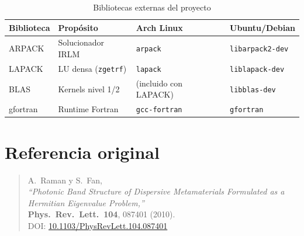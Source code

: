 \documentclass[12pt,a4paper]{article}
\begin{document}
\begin{table}[h]
    \centering
    \caption{Bibliotecas externas del proyecto}
    \begin{tabular}{@{}llll@{}}
        \toprule
        Biblioteca & Propósito & Arch Linux & Ubuntu/Debian \\
        \midrule
        ARPACK  & Solucionador IRLM       & \texttt{arpack}        & \texttt{libarpack2-dev} \\
        LAPACK  & LU densa (\texttt{zgetrf}) & \texttt{lapack}     & \texttt{liblapack-dev} \\
        BLAS    & Kernels nivel 1/2       & (incluido con LAPACK)  & \texttt{libblas-dev} \\
        gfortran & Runtime Fortran        & \texttt{gcc-fortran}   & \texttt{gfortran} \\
        \bottomrule
    \end{tabular}
\end{table}

\section{Referencia original}

\begin{quote}
    A.~Raman y S.~Fan,\\
    \textit{``Photonic Band Structure of Dispersive Metamaterials Formulated as a Hermitian Eigenvalue Problem,''}\\
    \textbf{Phys.\ Rev.\ Lett.\ 104}, 087401 (2010).\\
    DOI: \href{https://doi.org/10.1103/PhysRevLett.104.087401}{10.1103/PhysRevLett.104.087401}
\end{quote}

\end{document}
